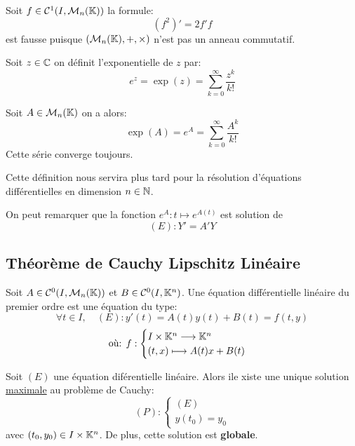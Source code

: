 \begin{remark} 
	Soit $f \in \mathcal{C}^1(I,\mathcal{M}_n(\mathbb{K}))$ la formule:
		\[ (f^2)' = 2f'f \] 
	est fausse puisque $( \mathcal{M}_n(\mathbb{K}), +, \times)$ n'est pas un anneau commutatif. 
\end{remark} 

\begin{definition}[Exponentielle] 
	Soit $z \in \mathbb{C}$ on définit l'exponentielle de $z$ par: 
		\[ e^z = \exp (z) = \sum_{k=0}^{\infty} \frac{z^k}{k!} \]
\end{definition} 

\begin{definition}
	Soit $A \in \mathcal{M}_n(\mathbb{K})$ on a alors: 
		\[ \exp(A) = e^A = \sum_{k=0}^{\infty} \frac{A^k}{k!} \] 
	Cette série converge toujours. 
\end{definition} 

\begin{remark} 
	Cette définition nous servira plus tard pour la résolution d'équations 
	différentielles en dimension $n \in \mathbb{N}$. 

	On peut remarquer que la fonction $e^A : t \longmapsto e^{A(t)} $ est solution de 
		\[ (E) : Y' = A'Y \]
\end{remark} 

\subsection{Théorème de Cauchy Lipschitz Linéaire} 

\begin{definition}
	Soit $A \in \mathcal{C}^0(I, \mathcal{M}_n(\mathbb{K}))$ et $ B \in \mathcal{C}^0(I,\mathbb{K}^n)$. 
	Une équation différentielle linéaire du premier ordre est une équation du type: 
		\[ \boxed{  \forall t \in I, \quad (E) : y'(t) = A(t)y(t) + B(t) = f(t,y)  } \]
		\[ \text{où: } f : 
			\begin{cases} 
				I \times \mathbb{K}^n \longrightarrow \mathbb{K}^n \\ 
				(t,x) \longmapsto A(t)x + B(t) 
			\end{cases} \]
\end{definition} 

\begin{theorem}
	Soit $(E)$ une équation diférentielle linéaire. Alors ile xiste une unique solution 
	\underline{maximale} au problème de Cauchy: 
		\[ (P) : 
			\begin{cases} 
				(E) \\ 
				y(t_0) = y_0 
			\end{cases} \] 
	avec $(t_0, y_0) \in I \times \mathbb{K}^n$. 
	De plus, cette solution est \textbf{globale}. 
\end{theorem} 


